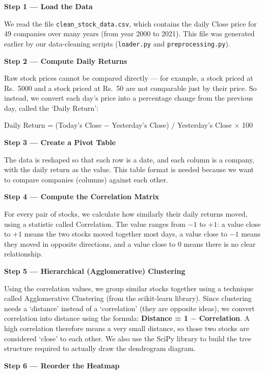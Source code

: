 \documentclass[14pt,a4paper]{extreport}
\begin{document}
\noindent\textbf{Step 1 --- Load the Data}

We read the file \texttt{clean\_stock\_data.csv}, which contains the daily
Close price for 49 companies over many years (from year 2000 to 2021).
This file was generated earlier by our data-cleaning scripts
(\texttt{loader.py} and \texttt{preprocessing.py}).

\noindent\textbf{Step 2 --- Compute Daily Returns}

Raw stock prices cannot be compared directly --- for example, a stock
priced at Rs.\ 5000 and a stock priced at Rs.\ 50 are not comparable just
by their price. So instead, we convert each day's price into a percentage
change from the previous day, called the `Daily Return':

\begin{center}
Daily Return = (Today's Close $-$ Yesterday's Close) / Yesterday's Close $\times$ 100
\end{center}

\noindent\textbf{Step 3 --- Create a Pivot Table}

The data is reshaped so that each row is a date, and each column is a
company, with the daily return as the value. This table format is needed
because we want to compare companies (columns) against each other.

\noindent\textbf{Step 4 --- Compute the Correlation Matrix}

For every pair of stocks, we calculate how similarly their daily returns
moved, using a statistic called Correlation. The value ranges from $-1$ to
$+1$: a value close to $+1$ means the two stocks moved together most days,
a value close to $-1$ means they moved in opposite directions, and a value
close to 0 means there is no clear relationship.

\noindent\textbf{Step 5 --- Hierarchical (Agglomerative) Clustering}

Using the correlation values, we group similar stocks together using a
technique called Agglomerative Clustering (from the scikit-learn library).
Since clustering needs a `distance' instead of a `correlation' (they are
opposite ideas), we convert correlation into distance using the formula:
\textbf{Distance = 1 $-$ Correlation}. A high correlation therefore means a
very small distance, so those two stocks are considered `close' to each
other. We also use the SciPy library to build the tree structure required
to actually draw the dendrogram diagram.

\noindent\textbf{Step 6 --- Reorder the Heatmap}
\end{document}
